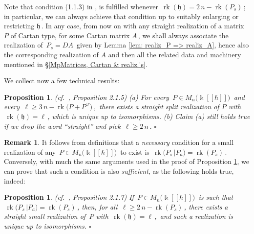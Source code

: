 \documentclass[12pt,reqno,twoside,a4paper]{amsart}
\numberwithin{equation}{section}
\newtheorem{prop}[lema]{Proposition}
\theoremstyle{definition}
\newtheorem{rmk}[lema]{Remark}
\newtheorem{free text}[lema]{}
\theoremstyle{remark}
\newcommand \rk{\operatorname{rk}}
\def \kh{{\Bbbk[[\hbar]]}}
\def \lieh{\mathfrak{h}}
\theoremstyle{plain}
\begin{document}
\vskip7pt

   Note that condition (1.1.3) in  \cite[Ch.\ 1, \S 1.1]{Ka1},  is fulfilled whenever  $ \, \rk(\lieh) = 2\,n - \rk(P_s) \, $;
   \,in particular, we can always achieve that condition up to suitably enlarging or restricting  $ \lieh \, $.
   In any case, from now on with any straight realization of a matrix  $ P $  of Cartan type, for some Cartan matrix  $ A \, $,
   we shall always associate the realization of  $ \, P_s = DA \, $  given by  Lemma \ref{lem: realiz_P => realiz_A},
   hence also the corresponding realization of  $ A $  and then all the related data and machinery mentioned in  \S \ref{MpMatrices, Cartan & realiz.'s}.

\vskip9pt

   We collect now a few technical results:

\vskip9pt

\begin{prop}  \label{prop: exist-realiz's}  \textsl{(cf.\ \cite{GG3}, Proposition 2.1.5)}
%
 \vskip3pt
%
   (a)\;  For every  $ \, P \in M_n\big(\kh\big) \, $  and every  $ \, \ell \geq 3\,n-\rk\big(P+P^{\,\scriptscriptstyle T}\big) \, $,
   \,there exists a straight split realization of  $ P $  with  $ \, \rk(\lieh) = \ell \, $,
 which
 is unique up to isomorphisms.
%
 \vskip3pt
%
   (b)\;  Claim (a) still holds true if we drop the word ``straight'' and pick  $ \, \ell \geq 2\,n \, $.  $ \square $
%
\end{prop}

\vskip7pt

\begin{rmk}
%
 It follows from definitions that a  \textsl{necessary\/}  condition for a small realization of any  $ \, P \in M_n\big(\kh\big) \, $
 to exist is  $ \, \rk\!\big( P_s \,\big| P_a \big) = \rk(P_s) \, $.
 Conversely, with much the same arguments used in the proof of
 Proposition \ref{prop: exist-realiz's},  we can prove that such a condition is also  \textsl{sufficient},  as the following holds true, indeed:
%
\end{rmk}

\eject
   \vskip7pt


\begin{prop}  \label{prop: exist-realiz's_small}  \textsl{(cf.\ \cite{GG3}, Proposition 2.1.7)}
%
 \vskip3pt
%
 If  $ \, P \in M_n\big(\kh\big) \, $  is such that  $ \, \rk\!\big( P_s \,\big| P_a \big) = \rk(P_s) \, $,
 then, for all  $ \, \ell \geq 2\,n-\rk(P_s) \, $,
 there exists a straight small realization of  $ \, P $  with  $ \, \rk(\lieh) = \ell \, $,
\,and such a realization is unique up to isomorphisms.   \hfill  $ \square $
%
\end{prop}
\end{document}
